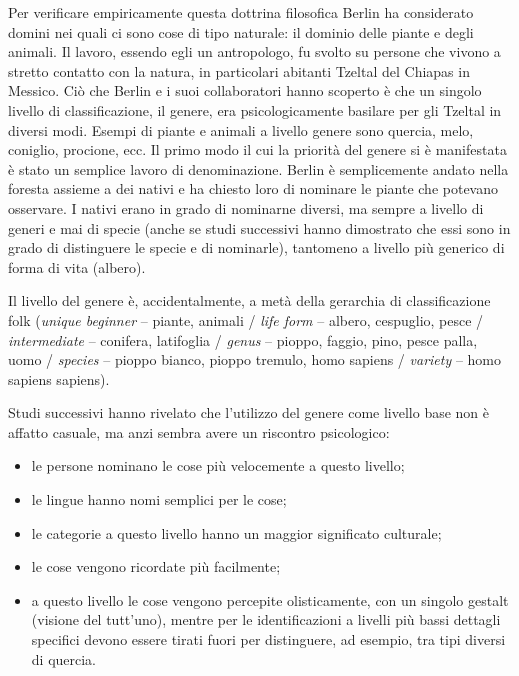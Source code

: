 Per verificare empiricamente questa dottrina filosofica Berlin ha considerato domini nei quali ci sono cose di tipo naturale: il dominio delle piante e degli animali. Il lavoro, essendo egli un antropologo, fu svolto su persone che vivono a stretto contatto con la natura, in particolari abitanti Tzeltal del Chiapas in Messico. Ciò che Berlin e i suoi collaboratori hanno scoperto è che un singolo livello di classificazione, il genere, era psicologicamente basilare per gli Tzeltal in diversi modi. Esempi di piante e animali a livello genere sono quercia, melo, coniglio, procione, ecc. Il primo modo il cui la priorità del genere si è manifestata è stato un semplice lavoro di denominazione. Berlin è semplicemente andato nella foresta assieme a dei nativi e ha chiesto loro di nominare le piante che potevano osservare. I nativi erano in grado di nominarne diversi, ma sempre a livello di generi e mai di specie (anche se studi successivi hanno dimostrato che essi sono in grado di distinguere le specie e di nominarle), tantomeno a livello più generico di forma di vita (albero).

Il livello del genere è, accidentalmente, a metà della gerarchia di classificazione folk (\emph{unique beginner} – piante, animali / \emph{life form} – albero, cespuglio, pesce / \emph{intermediate} – conifera, latifoglia / \emph{genus} – pioppo, faggio, pino, pesce palla, uomo / \emph{species} – pioppo bianco, pioppo tremulo, homo sapiens / \emph{variety} – homo sapiens sapiens).

Studi successivi hanno rivelato che l’utilizzo del genere come livello base non è affatto casuale, ma anzi sembra avere un riscontro psicologico:
\begin{itemize}
  \item le persone nominano le cose più velocemente a questo livello;
  \item le lingue hanno nomi semplici per le cose;
  \item le categorie a questo livello hanno un maggior significato culturale;
  \item le cose vengono ricordate più facilmente;
  \item a questo livello le cose vengono percepite olisticamente, con un singolo gestalt (visione del tutt’uno), mentre per le identificazioni a livelli più bassi dettagli specifici devono essere tirati fuori per distinguere, ad esempio, tra tipi diversi di quercia.
\end{itemize}

